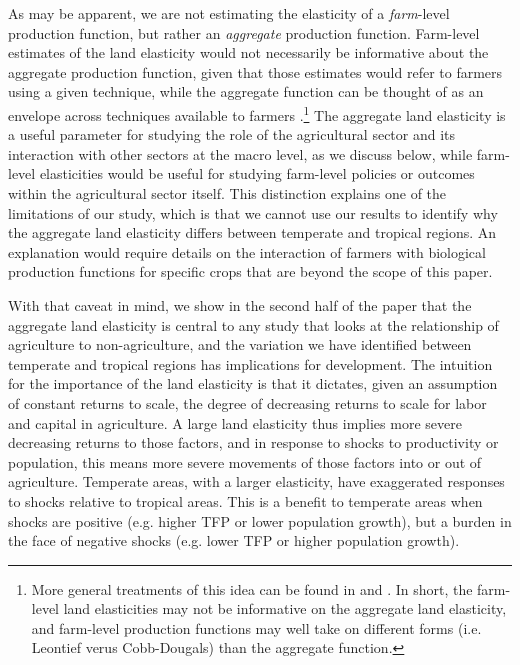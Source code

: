\documentclass[11pt]{article}
\begin{document}
As may be apparent, we are not estimating the elasticity of a \textit{farm}-level production function, but rather an \textit{aggregate} production function. Farm-level estimates of the land elasticity would not necessarily be informative about the aggregate production function, given that those estimates would refer to farmers using a given technique, while the aggregate function can be thought of as an envelope across techniques available to farmers \citep{Hayami:1970ly}.\footnote{More general treatments of this idea can be found in \citet{houthakker1955} and \citet{jones2005}. In short, the farm-level land elasticities may not be informative on the aggregate land elasticity, and farm-level production functions may well take on different forms (i.e. Leontief verus Cobb-Dougals) than the aggregate function.} The aggregate land elasticity is a useful parameter for studying the role of the agricultural sector and its interaction with other sectors at the macro level, as we discuss below, while farm-level elasticities would be useful for studying farm-level policies or outcomes within the agricultural sector itself. This distinction explains one of the limitations of our study, which is that we cannot use our results to identify why the aggregate land elasticity differs between temperate and tropical regions. An explanation would require details on the interaction of farmers with biological production functions for specific crops that are beyond the scope of this paper. 

With that caveat in mind, we show in the second half of the paper that the aggregate land elasticity is central to any study that looks at the relationship of agriculture to non-agriculture, and the variation we have identified between temperate and tropical regions has implications for development. The intuition for the importance of the land elasticity is that it dictates, given an assumption of constant returns to scale, the degree of decreasing returns to scale for labor and capital in agriculture. A large land elasticity thus implies more severe decreasing returns to those factors, and in response to shocks to productivity or population, this means more severe movements of those factors into or out of agriculture. Temperate areas, with a larger elasticity, have exaggerated responses to shocks relative to tropical areas. This is a benefit to temperate areas when shocks are positive (e.g. higher TFP or lower population growth), but a burden in the face of negative shocks (e.g. lower TFP or higher population growth).
\end{document}

